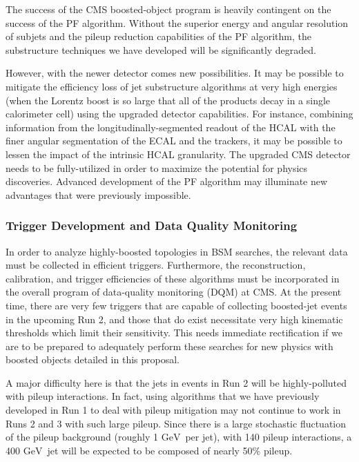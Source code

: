 \documentclass[12pt]{proposalnsf}
\newcommand{\GeVc}{\ensuremath{\mathrm{GeV}}}
\begin{document}
The success of the CMS boosted-object program is heavily
contingent on the success of the PF algorithm. Without the superior
energy and angular resolution of subjets and the pileup
reduction capabilities of the PF algorithm, the substructure
techniques we have developed will be significantly degraded.

However, with the newer detector comes new possibilities. It may be
possible to mitigate the efficiency loss of jet substructure
algorithms at very high energies (when the Lorentz boost is so large
that all of
the products decay in a single calorimeter cell) using the upgraded
detector capabilities. For instance, combining information from the
longitudinally-segmented
readout of the HCAL with the finer angular segmentation of the ECAL
and the trackers,
it may be possible to lessen the impact of the intrinsic
HCAL granularity. 
The upgraded CMS detector needs to be fully-utilized in order to
maximize the potential for physics discoveries. Advanced development
of the PF algorithm may illuminate new advantages that were
previously impossible.

\subsubsection{Trigger Development and Data Quality Monitoring}
\label{sec:dqm}

In order to analyze highly-boosted topologies in BSM searches, 
the relevant data must be collected in efficient triggers. Furthermore, the
reconstruction, calibration, and trigger efficiencies of these
algorithms must be incorporated in the overall program of 
data-quality monitoring (DQM) at CMS. At the present time, there are
very few triggers that are capable of collecting boosted-jet
events in the upcoming Run 2, and those that do exist necessitate very
high kinematic thresholds which limit their sensitivity. This needs
immediate rectification if we are to be prepared to adequately perform
these searches for new physics with boosted objects detailed in this
proposal. 

A major difficulty here is that the jets in events in
Run 2 will be highly-polluted with pileup interactions. 
In fact, using algorithms that we have previously developed in Run 1
to deal with pileup mitigation may not continue to work in Runs 2 and
3 with
such large pileup. Since there is a large stochastic fluctuation of
the pileup background (roughly 1 \GeVc\ per jet), with 140 pileup
interactions, a 400 \GeVc\ jet will be expected to be composed of
nearly 50\% pileup. 
\end{document}
